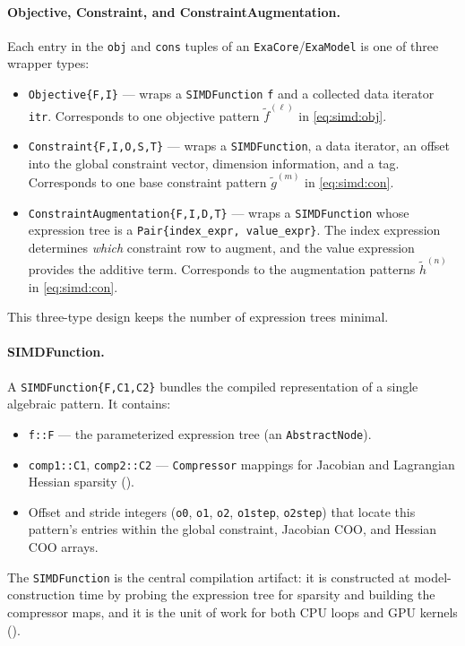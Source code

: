 \documentclass[11pt]{article}
\begin{document}
\paragraph{Objective, Constraint, and ConstraintAugmentation.}
Each entry in the \texttt{obj} and \texttt{cons} tuples of an \texttt{ExaCore}/\texttt{ExaModel} is one of three wrapper types:
\begin{itemize}
  \item \texttt{Objective\{F,I\}} --- wraps a \texttt{SIMDFunction} \texttt{f} and a collected data iterator \texttt{itr}. Corresponds to one objective pattern $\tilde{f}^{(\ell)}$ in \cref{eq:simd:obj}.
  \item \texttt{Constraint\{F,I,O,S,T\}} --- wraps a \texttt{SIMDFunction}, a data iterator, an offset into the global constraint vector, dimension information, and a tag. Corresponds to one base constraint pattern $\tilde{g}^{(m)}$ in \cref{eq:simd:con}.
  \item \texttt{ConstraintAugmentation\{F,I,D,T\}} --- wraps a \texttt{SIMDFunction} whose expression tree is a \texttt{Pair\{index\_expr, value\_expr\}}. The index expression determines \emph{which} constraint row to augment, and the value expression provides the additive term. Corresponds to the augmentation patterns $\tilde{h}^{(n)}$ in \cref{eq:simd:con}.
\end{itemize}
This three-type design keeps the number of expression trees minimal.

\paragraph{SIMDFunction.}
A \texttt{SIMDFunction\{F,C1,C2\}} bundles the compiled representation of a single algebraic pattern. It contains:
\begin{itemize}
  \item \texttt{f::F} --- the parameterized expression tree (an \texttt{AbstractNode}).
  \item \texttt{comp1::C1}, \texttt{comp2::C2} --- \texttt{Compressor} mappings for Jacobian and Lagrangian Hessian sparsity ().
  \item Offset and stride integers (\texttt{o0}, \texttt{o1}, \texttt{o2}, \texttt{o1step}, \texttt{o2step}) that locate this pattern's entries within the global constraint, Jacobian COO, and Hessian COO arrays.
\end{itemize}
The \texttt{SIMDFunction} is the central compilation artifact: it is constructed at model-construction time by probing the expression tree for sparsity and building the compressor maps, and it is the unit of work for both CPU loops and GPU kernels ().
\end{document}
